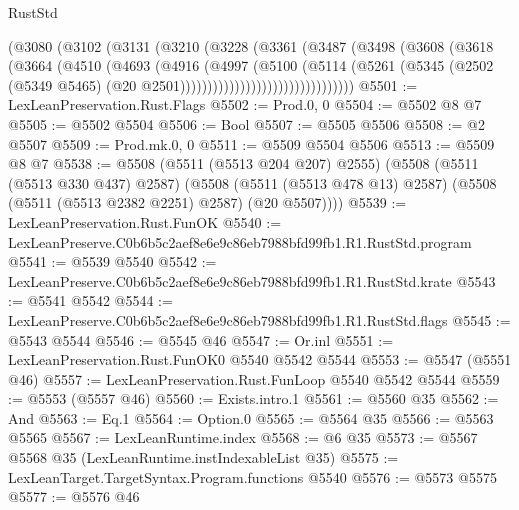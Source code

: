 \begin{lexlean}{RustStd}
\begin{coremodule}
                          (@3080
                            (@3102
                              (@3131
                                (@3210
                                  (@3228
                                    (@3361
                                      (@3487
                                        (@3498
                                          (@3608
                                            (@3618
                                              (@3664
                                                (@4510
                                                  (@4693
                                                    (@4916
                                                      (@4997
                                                        (@5100
                                                          (@5114
                                                            (@5261
                                                              (@5345
                                                                (@2502
                                                                  (@5349 @5465)
                                                                  (@20
                                                                    @2501))))))))))))))))))))))))))))))))
@5501 := LexLeanPreservation.Rust.Flags
@5502 := Prod.{0, 0}
@5504 := @5502 @8 @7
@5505 := @5502 @5504
@5506 := Bool
@5507 := @5505 @5506
@5508 := @2 @5507
@5509 := Prod.mk.{0, 0}
@5511 := @5509 @5504 @5506
@5513 := @5509 @8 @7
@5538 := @5508
    (@5511 (@5513 @204 @207) @2555)
    (@5508
      (@5511 (@5513 @330 @437) @2587)
      (@5508 (@5511 (@5513 @478 @13) @2587) (@5508 (@5511 (@5513 @2382 @2251) @2587) (@20 @5507))))
@5539 := LexLeanPreservation.Rust.FunOK
@5540 := LexLeanPreserve.C0b6b5c2aef8e6e9c86eb7988bfd99fb1.R1.RustStd.program
@5541 := @5539 @5540
@5542 := LexLeanPreserve.C0b6b5c2aef8e6e9c86eb7988bfd99fb1.R1.RustStd.krate
@5543 := @5541 @5542
@5544 := LexLeanPreserve.C0b6b5c2aef8e6e9c86eb7988bfd99fb1.R1.RustStd.flags
@5545 := @5543 @5544
@5546 := @5545 @46
@5547 := Or.inl
@5551 := LexLeanPreservation.Rust.FunOK0 @5540 @5542 @5544
@5553 := @5547 (@5551 @46)
@5557 := LexLeanPreservation.Rust.FunLoop @5540 @5542 @5544
@5559 := @5553 (@5557 @46)
@5560 := Exists.intro.{1}
@5561 := @5560 @35
@5562 := And
@5563 := Eq.{1}
@5564 := Option.{0}
@5565 := @5564 @35
@5566 := @5563 @5565
@5567 := LexLeanRuntime.index
@5568 := @6 @35
@5573 := @5567 @5568 @35 (LexLeanRuntime.instIndexableList @35)
@5575 := LexLeanTarget.TargetSyntax.Program.functions @5540
@5576 := @5573 @5575
@5577 := @5576 @46

\end{coremodule}
\end{lexlean}
